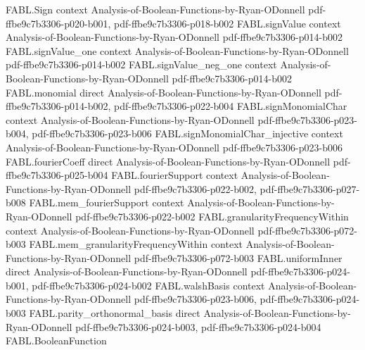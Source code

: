 \begin{theorem}
\label{FABL.coordinateNoisePMF_apply_neg'}
\leanok
{}
\proofstep
  {FABL.Sign}
  {context}
  {Analysis-of-Boolean-Functions-by-Ryan-ODonnell}
  {pdf-ffbe9c7b3306-p020-b001,
    pdf-ffbe9c7b3306-p018-b002}
\proofstep
  {FABL.signValue}
  {context}
  {Analysis-of-Boolean-Functions-by-Ryan-ODonnell}
  {pdf-ffbe9c7b3306-p014-b002}
\proofstep
  {FABL.signValue_one}
  {context}
  {Analysis-of-Boolean-Functions-by-Ryan-ODonnell}
  {pdf-ffbe9c7b3306-p014-b002}
\proofstep
  {FABL.signValue_neg_one}
  {context}
  {Analysis-of-Boolean-Functions-by-Ryan-ODonnell}
  {pdf-ffbe9c7b3306-p014-b002}
\proofstep
  {FABL.monomial}
  {direct}
  {Analysis-of-Boolean-Functions-by-Ryan-ODonnell}
  {pdf-ffbe9c7b3306-p014-b002,
    pdf-ffbe9c7b3306-p022-b004}
\proofstep
  {FABL.signMonomialChar}
  {context}
  {Analysis-of-Boolean-Functions-by-Ryan-ODonnell}
  {pdf-ffbe9c7b3306-p023-b004,
    pdf-ffbe9c7b3306-p023-b006}
\proofstep
  {FABL.signMonomialChar_injective}
  {context}
  {Analysis-of-Boolean-Functions-by-Ryan-ODonnell}
  {pdf-ffbe9c7b3306-p023-b006}
\proofstep
  {FABL.fourierCoeff}
  {direct}
  {Analysis-of-Boolean-Functions-by-Ryan-ODonnell}
  {pdf-ffbe9c7b3306-p025-b004}
\proofstep
  {FABL.fourierSupport}
  {context}
  {Analysis-of-Boolean-Functions-by-Ryan-ODonnell}
  {pdf-ffbe9c7b3306-p022-b002,
    pdf-ffbe9c7b3306-p027-b008}
\proofstep
  {FABL.mem_fourierSupport}
  {context}
  {Analysis-of-Boolean-Functions-by-Ryan-ODonnell}
  {pdf-ffbe9c7b3306-p022-b002}
\proofstep
  {FABL.granularityFrequencyWithin}
  {context}
  {Analysis-of-Boolean-Functions-by-Ryan-ODonnell}
  {pdf-ffbe9c7b3306-p072-b003}
\proofstep
  {FABL.mem_granularityFrequencyWithin}
  {context}
  {Analysis-of-Boolean-Functions-by-Ryan-ODonnell}
  {pdf-ffbe9c7b3306-p072-b003}
\proofstep
  {FABL.uniformInner}
  {direct}
  {Analysis-of-Boolean-Functions-by-Ryan-ODonnell}
  {pdf-ffbe9c7b3306-p024-b001,
    pdf-ffbe9c7b3306-p024-b002}
\proofstep
  {FABL.walshBasis}
  {context}
  {Analysis-of-Boolean-Functions-by-Ryan-ODonnell}
  {pdf-ffbe9c7b3306-p023-b006,
    pdf-ffbe9c7b3306-p024-b003}
\proofstep
  {FABL.parity_orthonormal_basis}
  {direct}
  {Analysis-of-Boolean-Functions-by-Ryan-ODonnell}
  {pdf-ffbe9c7b3306-p024-b003,
    pdf-ffbe9c7b3306-p024-b004}
\proofstep
  {FABL.BooleanFunction}

\end{theorem}
